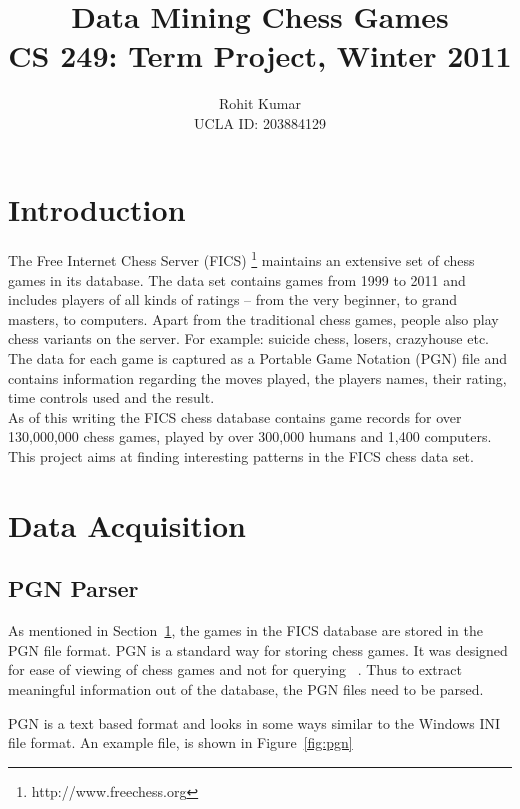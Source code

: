 \documentclass{article}
\author{Rohit Kumar \\UCLA ID: 203884129}
\title{Data Mining Chess Games \\ CS 249: Term Project, Winter 2011}
\begin{document}
\maketitle


\section{Introduction}
\label{sec:intro}
The Free Internet Chess Server (FICS) \footnote{http://www.freechess.org} maintains an extensive set of chess games in its database. The data set contains games from 1999 to 2011 and includes players of all kinds of ratings -- from the very beginner, to grand masters, to computers. Apart from the traditional chess games, people also play chess variants on the server. For example: suicide chess, losers, crazyhouse etc. The data for each game is captured as a Portable Game Notation (PGN) \cite{wiki:pgn} file and contains information regarding the moves played, the players names, their rating, time controls used and the result. \\

As of this writing the FICS chess database contains game records for over 130,000,000 chess games, played by over 300,000 humans and 1,400 computers. This project aims at finding interesting patterns in the FICS chess data set.

\section{Data Acquisition}

\subsection{PGN Parser}

As mentioned in Section~\ref{sec:intro}, the games in the FICS
database are stored in the PGN file format. PGN is a standard way for
storing chess games. It was designed for ease of viewing of chess
games and not for querying ~\cite{spec:pgn}. Thus to extract meaningful information out of the database, the PGN files need to be parsed.

PGN is a text based format and looks in some ways similar to the Windows INI file format. An example file, is shown in Figure~\ref{fig:pgn}
\end{document}
